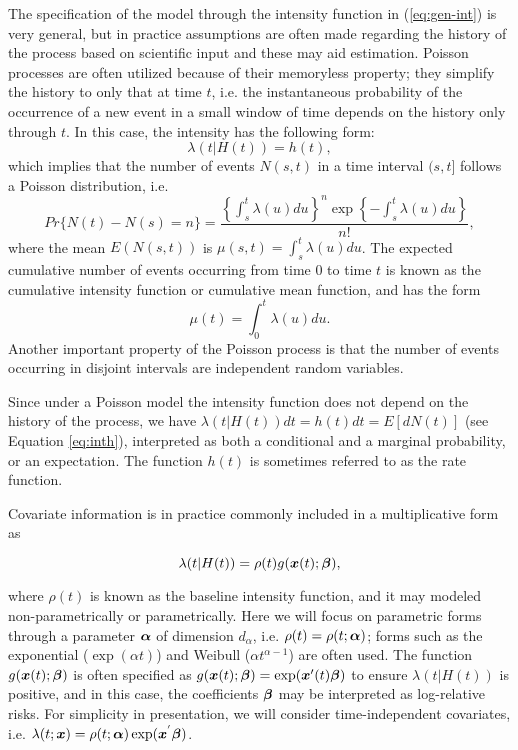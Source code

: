 \documentclass[12pt]{article}
\def \alph{\mbox{\boldmath $\alpha$ \unboldmath}\!\!}
\def \bet{\mbox{\boldmath $\beta$ \unboldmath}\!\!}
\def \bx{\mbox{\boldmath $x$ \unboldmath}\!\!}
\begin{document}
The specification of the model through the intensity function in (\ref{eq:gen-int}) is very general, but in practice assumptions are often made regarding the history of the process based on scientific input and these may aid estimation. Poisson processes are often utilized because of their memoryless property; they simplify the history to only that at time $t$, i.e. the instantaneous probability of the occurrence of a new event in a small window of time depends on the history only through $t$. In this case, the intensity has the following form: 
\begin{equation}\label{eq:inth}
\lambda(t|H(t))=  h(t), 
\end{equation}
\noindent which implies that the number of events $N(s,t)$ in a time interval $(s,t]$ follows a Poisson distribution, i.e. 
\begin{equation}
Pr\{N(t)-N(s)=n\}=\frac{ \left\{\int_{s}^{t} \lambda(u) du \right\}^n \exp \left\{-\int_{s}^{t} \lambda(u) du \right\} }{n!},
\end{equation}
\noindent where the mean $E(N(s,t))$ is $ \mu(s,t)=\int_{s}^{t} \lambda(u) du$. The expected cumulative number of events occurring from time 0 to time $t$ is known as the cumulative intensity function or cumulative mean function, and has the form  
\begin{equation}
\mu(t)=\int_{0}^{t} \lambda(u) du.
\end{equation}
\noindent Another important property of the Poisson process is that the number of events occurring in disjoint intervals are independent random variables.

Since under a Poisson model the intensity function does not depend on the history of the process, we have $\lambda(t|H(t)) dt=h(t) dt=E[dN(t)]$ (see Equation \ref{eq:inth}), interpreted as both a conditional and a marginal probability, or an expectation. The function $h(t)$ is sometimes referred to as the rate function. 

Covariate information is in practice commonly included in a multiplicative form as

\begin{equation}\label{eq:int}
\lambda(t|H(t))=\rho (t) g(\bx(t); \bet), 
\end{equation}

\noindent where $\rho (t)$ is known as the baseline intensity function, and it may modeled non-parametrically or parametrically. Here we will focus on parametric forms through a parameter $\alph$ of dimension $d_{\alpha}$, i.e. $\rho(t)=\rho(t;\alph)$; forms such as the exponential ($\exp(\alpha t)$) and Weibull ($\alpha t^{\alpha-1}$) are often used. The function $g(\bx(t); \bet)$ is often specified as $g(\bx(t); \bet)=\exp(\bx'(t)\bet)$ to ensure $\lambda(t|H(t))$ is positive, and in this case, the coefficients $\bet$ may be interpreted as log-relative risks.  For simplicity in presentation, we will consider time-independent covariates, i.e. $\lambda(t;\bx)=\rho(t;\alph) \exp ( {\bx}^{'} \bet )$.
\end{document}
